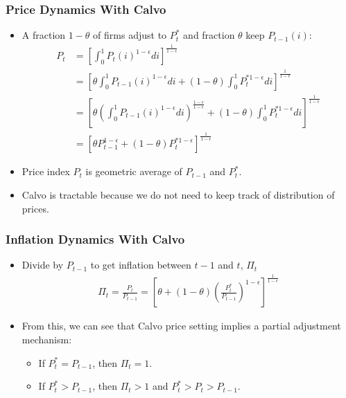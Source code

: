 \documentclass[english,xcolor=svgnames]{beamer}
\begin{document}
\begin{frame}
\frametitle{Price Dynamics With Calvo}
\begin{itemize}
	\item A fraction $1-\theta$ of firms adjust to $P_t^*$ and fraction $\theta$ keep $P_{t-1}(i)$:
	\begin{align*}P_t&=\left[\int_0^1 P_t(i)^{1-\epsilon}di\right]^{\frac{1}{1-\epsilon}}\\
		&=\left[\theta \int_0^1 P_{t-1}(i)^{1-\epsilon}di + (1-\theta)\int_0^1 P_{t}^{*1-\epsilon}di\right]^{\frac{1}{1-\epsilon}} \\
		&=\left[\theta \left(\int_0^1 P_{t-1}(i)^{1-\epsilon}di\right)^{\frac{1-\epsilon}{1-\epsilon}} + (1-\theta)\int_0^1 P_{t}^{*1-\epsilon}di\right]^{\frac{1}{1-\epsilon}}\\
		&=\left[\theta P_{t-1}^{1-\epsilon} + (1-\theta) P_{t}^{*1-\epsilon}\right]^{\frac{1}{1-\epsilon}}
	\end{align*}
	\item Price index $P_t$ is geometric average of $P_{t-1}$ and $P_t^*$.
	\item Calvo is tractable because we do not need to keep track of distribution of prices.
\end{itemize}
\end{frame}


\begin{frame}
\frametitle{Inflation Dynamics With Calvo
}
\begin{itemize}
	\item Divide by $P_{t-1}$ to get inflation between $t-1$ and $t$, $\Pi_t$ 
	\begin{align*}\Pi_t =\frac{P_t}{P_{t-1}}=\left[\theta  + (1-\theta) \left(\frac{P_{t}^{*}}{P_{t-1}}\right)^{1-\epsilon}\right]^{\frac{1}{1-\epsilon}}
	\end{align*}
	\item From this, we can see that Calvo price setting implies a partial adjustment mechanism:
	\begin{itemize}
		\item If $P_t^*=P_{t-1}$, then $\Pi_t=1$.
		\item If $P_t^*>P_{t-1}$, then $\Pi_t>1$ and $P_t^*>P_t> P_{t-1}$.
	\end{itemize}
	\end{itemize}
\end{frame}
\end{document}
